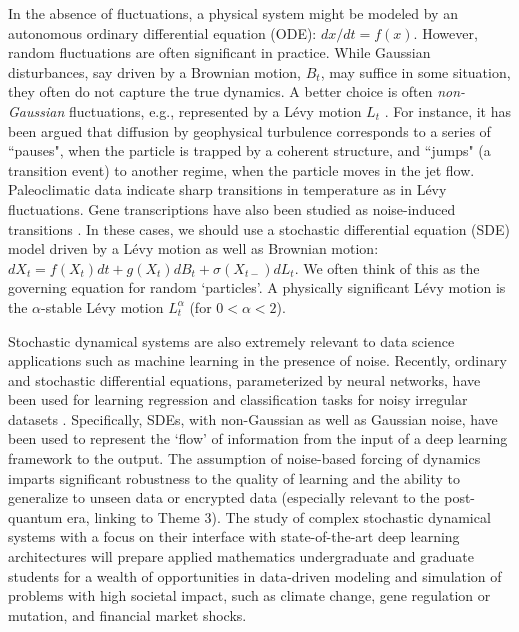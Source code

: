 \documentclass[11pt]{NSFamsart}
\begin{document}
In the absence of fluctuations, a physical system might be modeled by an autonomous ordinary differential equation (ODE): $ dx/dt=f(x)$.  However, random fluctuations are often significant in practice. While Gaussian disturbances, say driven by a  Brownian motion, $B_t$, may suffice in some situation, they often do not capture the true dynamics.  A better choice is often \emph{non-Gaussian} fluctuations, e.g., represented by a L\'evy motion $L_t$ \cite{Woy,Dit, Shlesinger,taqqu,dybiec2009levy}. For instance, it has been argued that diffusion by geophysical turbulence \cite{Shlesinger}
corresponds  to a series of  ``pauses", when the
particle is trapped by a coherent structure, and  
``jumps" (a transition event) to another regime, when the particle moves in the jet
flow. Paleoclimatic data \cite{Dit, ZhengYY2020}   indicate   sharp transitions in temperature as in L\'evy fluctuations. Gene transcriptions have also been studied as noise-induced transitions \cite{Raser2005,Suel06,Lin2016GeneED, ChenWuDuan}. 
In these cases, we should use a
 stochastic   differential equation (SDE)  model \cite{Arnold,   Oksendal, DuanBook2015, Applebaum}
 driven by a L\'evy motion as well as Brownian motion:
 $
 dX_t= f(X_t) dt + g(X_t) dB_t + \sigma(X_{t-}) dL_t.
 $
 We often think of this as the governing equation for random `particles'. A physically significant L\'evy motion is the  $\alpha$-stable L\'evy motion $L_t^\alpha$ (for $0<\alpha<2$).  
 
 
Stochastic dynamical systems are also extremely relevant to data science applications such as machine learning in the presence of  noise. Recently, ordinary and stochastic differential equations, parameterized by neural networks, have been used for learning regression and classification tasks for noisy irregular datasets \cite{chen2018neural,rubanova2019latent,jia2019neural,tzen2019neural,look2020deterministic,liu2019neural}. Specifically, SDEs, with non-Gaussian as well as Gaussian noise, have been used to represent the `flow' of information from the input of a deep learning framework to the output. The assumption of noise-based forcing of dynamics imparts significant robustness to the quality of learning and the ability to generalize to unseen data or encrypted data (especially relevant to the post-quantum era, linking to Theme 3). The study of complex stochastic dynamical systems with a focus on their interface with state-of-the-art deep learning architectures will prepare applied mathematics undergraduate and graduate students for a wealth of opportunities in data-driven modeling and simulation of problems with high societal impact, such as climate change, gene regulation or mutation, and financial market shocks.
\end{document}

